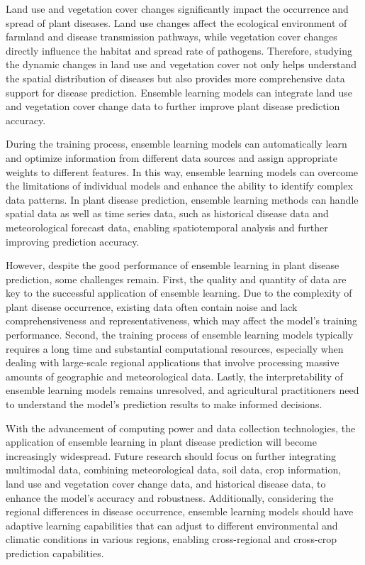 \documentclass[AutoFakeBold]{LZUThesis-PgD&PhD}
\begin{document}
{Land use and vegetation cover changes significantly impact the occurrence and spread of plant diseases. Land use changes affect the ecological environment of farmland and disease transmission pathways, while vegetation cover changes directly influence the habitat and spread rate of pathogens. Therefore, studying the dynamic changes in land use and vegetation cover not only helps understand the spatial distribution of diseases but also provides more comprehensive data support for disease prediction. Ensemble learning models can integrate land use and vegetation cover change data to further improve plant disease prediction accuracy.

During the training process, ensemble learning models can automatically learn and optimize information from different data sources and assign appropriate weights to different features. In this way, ensemble learning models can overcome the limitations of individual models and enhance the ability to identify complex data patterns. In plant disease prediction, ensemble learning methods can handle spatial data as well as time series data, such as historical disease data and meteorological forecast data, enabling spatiotemporal analysis and further improving prediction accuracy.

However, despite the good performance of ensemble learning in plant disease prediction, some challenges remain. First, the quality and quantity of data are key to the successful application of ensemble learning. Due to the complexity of plant disease occurrence, existing data often contain noise and lack comprehensiveness and representativeness, which may affect the model's training performance. Second, the training process of ensemble learning models typically requires a long time and substantial computational resources, especially when dealing with large-scale regional applications that involve processing massive amounts of geographic and meteorological data. Lastly, the interpretability of ensemble learning models remains unresolved, and agricultural practitioners need to understand the model's prediction results to make informed decisions.

With the advancement of computing power and data collection technologies, the application of ensemble learning in plant disease prediction will become increasingly widespread. Future research should focus on further integrating multimodal data, combining meteorological data, soil data, crop information, land use and vegetation cover change data, and historical disease data, to enhance the model's accuracy and robustness. Additionally, considering the regional differences in disease occurrence, ensemble learning models should have adaptive learning capabilities that can adjust to different environmental and climatic conditions in various regions, enabling cross-regional and cross-crop prediction capabilities.

}
\end{document}
